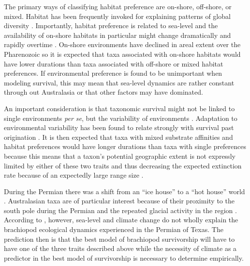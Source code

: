 \documentclass[12pt,letterpaper]{article}
\begin{document}
The primary ways of classifying habitat preference are on-shore, off-shore, or mixed. Habitat has been frequently invoked for explaining patterns of global diversity \citep{Sepkoski1991,Kiessling2007a,Bottjer1988,Jablonski1991,Jablonski1983b}. Importantly, habitat preference is related to sea-level and the availability of on-shore habitats in particular might change dramatically and rapidly overtime \citep{Olszewski2004}. On-shore environments have declined in areal extent over the Pharenozoic \citep{Peters2008} so it is expected that taxa associated with on-shore habitats would have lower durations than taxa associated with off-shore or mixed habitat preferences. If environmental preference is found to be unimportant when modeling survival, this may mean that sea-level dynamics are rather constant through out Australasia or that other factors may have dominated.

An important consideration is that taxonomic survival might not be linked to single environments \textit{per se}, but the variability of environments \citep{Foote2013,Heim2011,Liow2007b}. Adaptation to environmental variability has been found to relate strongly with survival past origination \citep{Foote2013}. It is then expected that taxa with mixed substrate affinities and habitat preferences would have longer durations than taxa with single preferences because this means that a taxon's potential geographic extent is not expressly limited by either of these two traits and thus decreasing the expected extinction rate because of an expectedly large range size \citep{Jablonski1986,Harnik2013,Nurnberg2013a,Jablonski2003,Roy2009c}. 

During the Permian there was a shift from an ``ice house'' to a ``hot house'' world \citep{Fielding2006,Birgenheier2010,Jones2006,Powell2007}. Australasian taxa are of particular interest because of their proximity to the south pole during the Permian and the repeated glacial activity in the region \citep{Fielding2006,Birgenheier2010,Jones2006}. According to \citet{Olszewski2004}, however, sea-level and climate change do not wholly explain the brachiopod ecological dynamics experienced in the Permian of Texas. The prediction then is that the best model of brachiopod survivorship will have to have one of the three traits described above while the necessity of climate as a predictor in the best model of survivorship is necessary to determine empirically.
\end{document}
